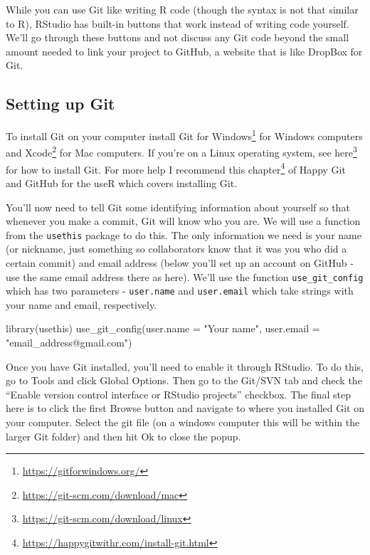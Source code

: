 \documentclass[
]{krantz}
\makeatletter
\newenvironment{Shaded}{\begin{snugshade}}{\end{snugshade}}
\newcommand{\AttributeTok}[1]{\textcolor[rgb]{0.61,0.61,0.61}{#1}}
\newcommand{\FunctionTok}[1]{\textcolor[rgb]{0,0,0}{#1}}
\newcommand{\NormalTok}[1]{#1}
\newcommand{\StringTok}[1]{\textcolor[rgb]{0.5,0.5,0.5}{#1}}
\renewcommand{\href}[2]{#2\footnote{\url{#1}}}
\newenvironment{kframe}{%
\medskip{}
\setlength{\fboxsep}{.8em}
 \def\at@end@of@kframe{}%
 \ifinner\ifhmode%
  \def\at@end@of@kframe{\end{minipage}}%
  \begin{minipage}{\columnwidth}%
 \fi\fi%
 \def\FrameCommand##1{\hskip\@totalleftmargin \hskip-\fboxsep
 \colorbox{shadecolor}{##1}\hskip-\fboxsep
     \hskip-\linewidth \hskip-\@totalleftmargin \hskip\columnwidth}%
 \MakeFramed {\advance\hsize-\width
   \@totalleftmargin\z@ \linewidth\hsize
   \@setminipage}}%
 {\par\unskip\endMakeFramed%
 \at@end@of@kframe}
\renewenvironment{Shaded}{\begin{kframe}}{\end{kframe}}
\makeatother
\begin{document}
While you can use Git like writing R code (though the syntax is not that similar to R), RStudio has built-in buttons that work instead of writing code yourself. We'll go through these buttons and not discuss any Git code beyond the small amount needed to link your project to GitHub, a website that is like DropBox for Git.

\hypertarget{setting-up-git}{%
\subsection{Setting up Git}\label{setting-up-git}}

To install Git on your computer install \href{https://gitforwindows.org/}{Git for Windows} for Windows computers and \href{https://git-scm.com/download/mac}{Xcode} for Mac computers. If you're on a Linux operating system, see \href{https://git-scm.com/download/linux}{here} for how to install Git. For more help I recommend \href{https://happygitwithr.com/install-git.html}{this chapter} of Happy Git and GitHub for the useR which covers installing Git.

You'll now need to tell Git some identifying information about yourself so that whenever you make a commit, Git will know who you are. We will use a function from the \texttt{usethis} package to do this. The only information we need is your name (or nickname, just something so collaborators know that it was you who did a certain commit) and email address (below you'll set up an account on GitHub - use the same email address there as here). We'll use the function \texttt{use\_git\_config} which has two parameters - \texttt{user.name} and \texttt{user.email} which take strings with your name and email, respectively.

\begin{Shaded}
\begin{Highlighting}[]
\FunctionTok{library}\NormalTok{(usethis)}
\FunctionTok{use\_git\_config}\NormalTok{(}\AttributeTok{user.name =} \StringTok{"Your name"}\NormalTok{, }\AttributeTok{user.email =} \StringTok{"email\_address@gmail.com"}\NormalTok{)}
\end{Highlighting}
\end{Shaded}

Once you have Git installed, you'll need to enable it through RStudio. To do this, go to Tools and click Global Options. Then go to the Git/SVN tab and check the ``Enable version control interface or RStudio projects'' checkbox. The final step here is to click the first Browse button and navigate to where you installed Git on your computer. Select the git file (on a windows computer this will be within the larger Git folder) and then hit Ok to close the popup.
\end{document}
